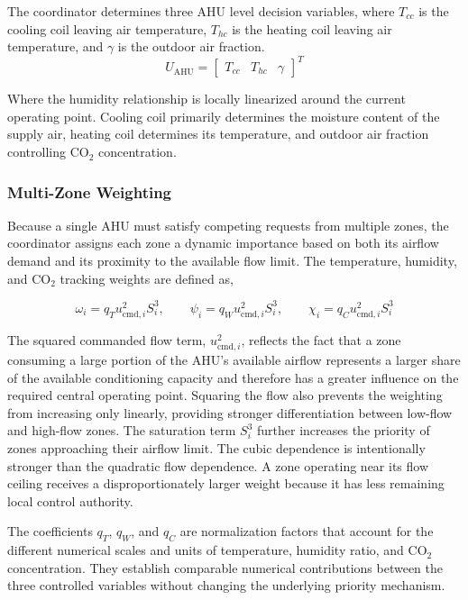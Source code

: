 \documentclass[12pt, a4paper]{article}
\begin{document}
	
	The coordinator determines three AHU level decision variables, 	where $T_{cc}$ is the cooling coil leaving air temperature, $T_{hc}$ is the heating coil leaving air temperature, and $\gamma$ is the outdoor air fraction. 
	\begin{equation}
		U_{\mathrm{AHU}} =
		\begin{bmatrix}
			T_{cc} & T_{hc} & \gamma
		\end{bmatrix}^{T}
	\end{equation}

	Where the humidity relationship is locally linearized around the current operating point. Cooling coil primarily determines the moisture content of the supply air, heating coil determines its temperature, and outdoor air fraction controlling CO$_2$ concentration.
	
	\subsubsection{Multi-Zone Weighting}
	
	Because a single AHU must satisfy competing requests from multiple zones, the coordinator assigns each zone a dynamic importance based on both its airflow demand and its proximity to the available flow limit. The temperature, humidity, and CO$_2$ tracking weights are defined as,

	\begin{equation}
\omega_i = q_T u_{\mathrm{cmd},i}^{2} S_i^{3}, \qquad \psi_i = q_W u_{\mathrm{cmd},i}^{2} S_i^{3}, \qquad \chi_i = q_C u_{\mathrm{cmd},i}^{2} S_i^{3}
	\end{equation}
	
	
	The squared commanded flow term, $u_{\mathrm{cmd},i}^{2}$, reflects the fact that a zone consuming a large portion of the AHU's available airflow represents a larger share of the available conditioning capacity and therefore has a greater influence on the required central operating point. Squaring the flow also prevents the weighting from increasing only linearly, providing stronger differentiation between low-flow and high-flow zones. The saturation term $S_i^{3}$ further increases the priority of zones approaching their airflow limit. The cubic dependence is intentionally stronger than the quadratic flow dependence. A zone operating near its flow ceiling receives a disproportionately larger weight because it has less remaining local control authority. 
	
	The coefficients $q_T$, $q_W$, and $q_C$ are normalization factors that account for the different numerical scales and units of temperature, humidity ratio, and CO$_2$ concentration. They establish comparable numerical contributions between the three controlled variables without changing the underlying priority mechanism.
	
\end{document}
